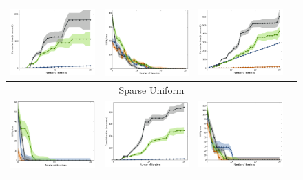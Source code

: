 \documentclass{article}
\renewcommand\[{\begin{equation}}
\renewcommand\]{\end{equation}}
\begin{document}
\begin{figure}[h!]
{\begin{tabular}{cccc}
        \includegraphics[width=10em]{figures/synthetic_vs_others_3_normal_per_iter_time} &
        \includegraphics[width=10em]{figures/synthetic_vs_others_4_normal_per_iter_loss} &
        \includegraphics[width=10em]{figures/synthetic_vs_others_4_normal_per_iter_time}
        \\
        \hline
        \multicolumn{4}{c}{{\sc Sparse Uniform}}
        \\
        \includegraphics[width=10em]{figures/synthetic_vs_others_3_uniform_sparse_per_iter_loss} &
        \includegraphics[width=10em]{figures/synthetic_vs_others_3_uniform_sparse_per_iter_time} &
        \includegraphics[width=10em]{figures/synthetic_vs_others_4_uniform_sparse_per_iter_loss} &

\end{tabular}}
\end{figure}
\end{document}

